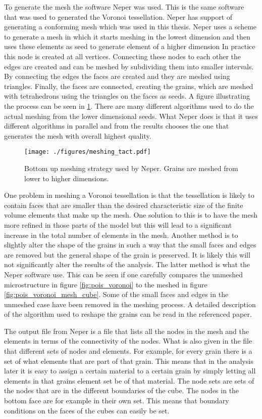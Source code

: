 \documentclass[meshing_micro.tex]{subfiles}
\begin{document}
To generate the mesh the software Neper was used. 
This is the same software that was used to generated the Voronoi tessellation. Neper has support of generating a conforming mesh which was used in this thesis. Neper uses a scheme to generate a mesh in which it starts meshing in the lowest dimension and then uses these elements as seed to generate element of a higher dimension  In practice this  node is created at all vertices. Connecting these nodes to each other the edges are created and can be meshed by subdividing them into smaller intervals. 
By connecting the edges the faces are created and they are meshed using triangles. Finally, the faces are connected, creating the grains, which are meshed with tetrahedrons using the triangles on the faces as seeds. A figure illustrating the process can be seen in \ref{fig:mesh_strat}. There are many different algorithms used to do the actual meshing from the lower dimensional seeds. 
What Neper does is that it uses different algorithms in parallel and from the results chooses the one that generates the mesh with overall highest quality.

 \begin{figure}
\centering
  \texttt{[image: ./figures/meshing\_tact.pdf]}
\caption{Bottom up meshing strategy used by Neper. Grains are meshed from lower to higher dimensions.}
\label{fig:mesh_strat}
\end{figure}


One problem in meshing a Voronoi tessellation is that the tessellation is likely to contain faces that are smaller than the desired characteristic size of the finite volume elements that make up the mesh. One solution to this is to have the mesh more refined in those parts of the model but this will lead to a significant increase in the total number of elements in the mesh.  Another method is to slightly alter the shape of the grains in such a way that the small faces and edges are removed but the general shape of the grain is preserved. It is likely this will not significantly alter the results of the analysis. The latter method is what the Neper software use. This can be seen if one carefully compares the unmeshed microstructure in figure \ref{fig:pois_voronoi} to the meshed in figure \ref{fig:pois_voronoi_mesh_cube}. Some of the small faces and edges in the unmeshed case have been removed in the meshing process. A detailed description of the algorithm used to reshape the grains can be read in the referenced paper.
 
The output file from Neper is a file that lists all the nodes in the mesh and the elements in terms of the connectivity of the nodes. What is also given in the file that different sets of nodes and elements. For example, for every grain there is a set of what elements that are part of that grain. This means that in the analysis later it is easy to assign a certain material to a certain grain by simply letting all elements in that grains element set be of that material. The node sets are sets of the nodes that are in the different boundaries of the cube. The nodes in the bottom face are for example in their own set. This means that boundary conditions on the faces of the cubes can easily be set.
\end{document}
